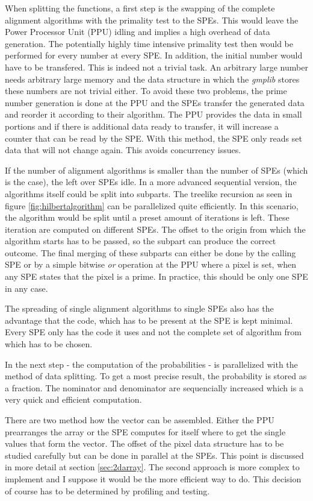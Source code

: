 When splitting the functions, a first step is the swapping of the complete alignment algorithms with the primality test to the SPEs. This would leave the Power Processor Unit (PPU) idling and implies a high overhead of data generation. The potentially highly time intensive primality test then would be performed for every number at every SPE. In addition, the initial number would have to be transfered. This is indeed not a trivial task. An arbitrary large number needs arbitrary large memory and the data structure in which the \emph{gmplib} stores these numbers are not trivial either.
To avoid these two problems, the prime number generation is done at the PPU and the SPEs transfer the generated data and reorder it according to their algorithm.
The PPU provides the data in small portions and if there is additional data ready to transfer, it will increase a counter that can be read by the SPE. With this method, the SPE only reads set data that will not change again. This avoids concurrency issues.

If the number of alignment algorithms is smaller than the number of SPEs (which is the case), the left over SPEs idle. In a more advanced sequential version, the algorithms itself could be split into subparts. The treelike  recursion as seen in figure \ref{fig:hilbertalgorithm} can be parallelized quite efficiently. In this scenario, the algorithm would be split until a preset amount of iterations is left. These iteration are computed on different SPEs. The offset to the origin from which the algorithm starts has to be passed, so the subpart can produce the correct outcome. The final merging of these subparts can either be done by the calling SPE or by a simple bitwise \emph{or} operation at the PPU where a pixel is set, when any SPE states that the pixel is a prime. In practice, this should be only one SPE in any case.

The spreading of single alignment algorithms to single SPEs also has the advantage that the code, which has to be present at the SPE is kept minimal. Every SPE only has the code it uses and not the complete set of algorithm from which has to be chosen.

In the next step - the computation of the probabilities - is parallelized with the method of data splitting. To get a most precise result, the probability is stored as a fraction. The nominator and denominator are sequencially increased which is a very quick and efficient computation.

There are two method how the vector can be assembled. Either the PPU prearranges the array or the SPE computes for itself where to get the single values that form the vector.  The offset of the pixel data structure has to be studied carefully but can be done in parallel at the SPEs. This point is discussed in more detail at section \ref{sec:2darray}. The second approach is more complex to implement and I suppose it would be the more efficient way to do. This decision of course has to be determined by profiling and testing.

